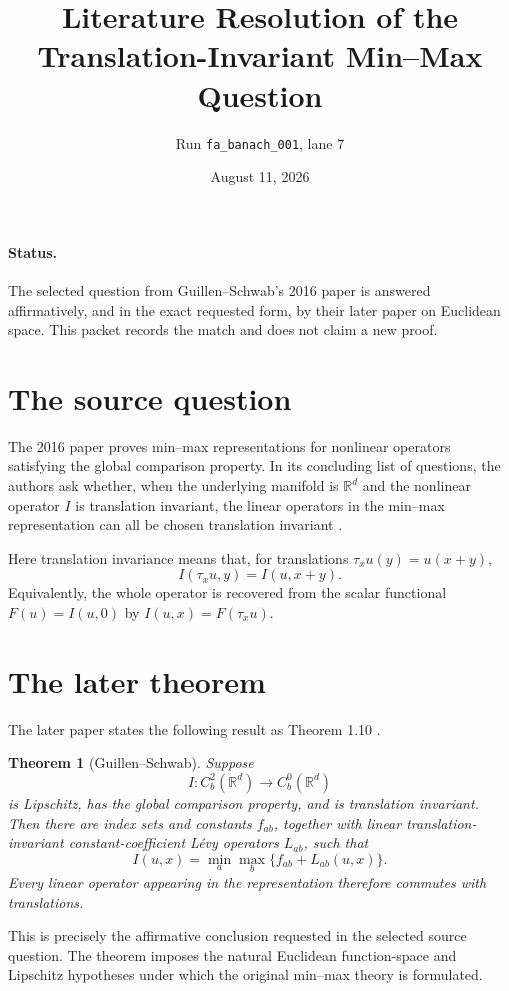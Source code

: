 \documentclass[11pt]{article}
\title{Literature Resolution of the Translation-Invariant Min--Max Question}
\author{Run \texttt{fa\_banach\_001}, lane 7}
\date{August 11, 2026}
\newtheorem{theorem}{Theorem}
\newcommand{\R}{\mathbb{R}}
\begin{document}
\maketitle

\paragraph{Status.}
The selected question from Guillen--Schwab's 2016 paper is answered affirmatively, and in the exact requested form, by their later paper on Euclidean space.  This packet records the match and does not claim a new proof.

\section*{The source question}
The 2016 paper proves min--max representations for nonlinear operators satisfying the global comparison property.  In its concluding list of questions, the authors ask whether, when the underlying manifold is \(\R^d\) and the nonlinear operator \(I\) is translation invariant, the linear operators in the min--max representation can all be chosen translation invariant \cite[Section 1.5]{GS2016}.

Here translation invariance means that, for translations \(\tau_xu(y)=u(x+y)\),
\[
 I(\tau_xu,y)=I(u,x+y).
\]
Equivalently, the whole operator is recovered from the scalar functional
\(F(u)=I(u,0)\) by \(I(u,x)=F(\tau_xu)\).

\section*{The later theorem}
The later paper states the following result as Theorem 1.10 \cite[Theorem 1.10]{GS2020}.

\begin{theorem}[Guillen--Schwab]
Suppose
\[
 I:C_b^2(\R^d)\longrightarrow C_b^0(\R^d)
\]
is Lipschitz, has the global comparison property, and is translation invariant.  Then there are index sets and constants \(f_{ab}\), together with linear translation-invariant constant-coefficient L\'evy operators \(L_{ab}\), such that
\[
 I(u,x)=\min_a\max_b\bigl\{f_{ab}+L_{ab}(u,x)\bigr\}.
\]
Every linear operator appearing in the representation therefore commutes with translations.
\end{theorem}

This is precisely the affirmative conclusion requested in the selected source question.  The theorem imposes the natural Euclidean function-space and Lipschitz hypotheses under which the original min--max theory is formulated.
\end{document}
